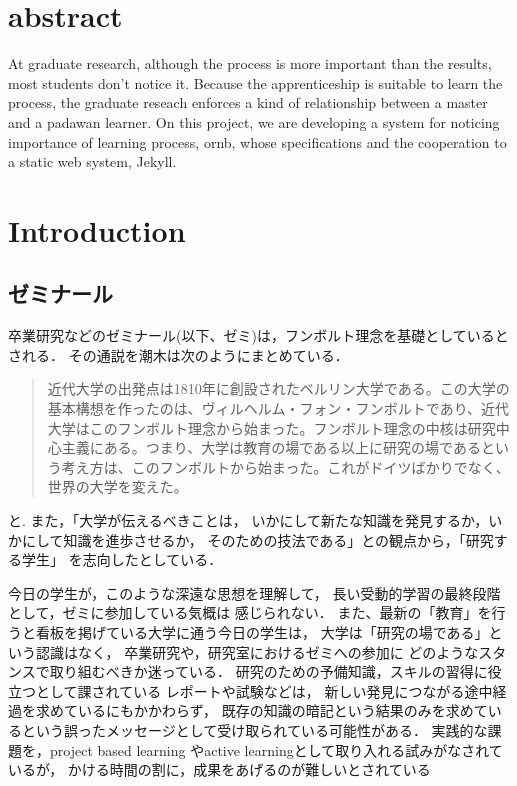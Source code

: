\documentclass[a4,p11]{article}
\author{bob}
\date{}
\title{}
\begin{document}
\section{abstract}
\label{sec:org29ee7f0}
At graduate research,
although the process is more important than the results,
most students don't notice it.
Because the apprenticeship is suitable to learn the process,
the graduate reseach enforces a kind of
relationship between
a master and a padawan learner.
On this project,
we are developing a system for
noticing importance of learning process,
ornb, whose specifications and
the cooperation to a static web system, Jekyll.

\section{Introduction}
\label{sec:orgd678562}
\subsection{ゼミナール}
\label{sec:org48ea560}
卒業研究などのゼミナール(以下、ゼミ)は，フンボルト理念を基礎としているとされる．
その通説を潮木は次のようにまとめている．
\begin{quote}
近代大学の出発点は1810年に創設されたベルリン大学である。この大学の基本構想を作ったのは、ヴィルヘルム・フォン・フンボルトであり、近代大学はこのフンボルト理念から始まった。フンボルト理念の中核は研究中心主義にある。つまり、大学は教育の場である以上に研究の場であるという考え方は、このフンボルトから始まった。これがドイツばかりでなく、世界の大学を変えた。\cite{Ushiogi_column}
\end{quote}
と. また，「大学が伝えるべきことは，
いかにして新たな知識を発見するか，いかにして知識を進歩させるか，
そのための技法である」との観点から，「研究する学生」
を志向したとしている\cite{Ushiogi}．

今日の学生が，このような深遠な思想を理解して，
長い受動的学習の最終段階として，ゼミに参加している気概は
感じられない．
また、最新の「教育」を行うと看板を掲げている大学に通う今日の学生は，
大学は「研究の場である」という認識はなく，
卒業研究や，研究室におけるゼミへの参加に
どのようなスタンスで取り組むべきか迷っている．
研究のための予備知識，スキルの習得に役立つとして課されている
レポートや試験などは，
新しい発見につながる途中経過を求めているにもかかわらず，
既存の知識の暗記という結果のみを求めているという誤ったメッセージとして受け取られている可能性がある．
実践的な課題を，project based learning \cite{Bell}
やactive learningとして取り入れる試みがなされているが\cite{Settles,溝上}，
かける時間の割に，成果をあげるのが難しいとされている
\end{document}
